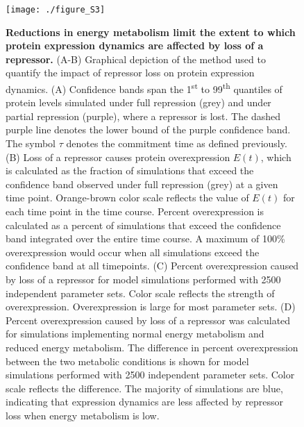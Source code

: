 \begin{figure}[h!]
\centering
\texttt{[image: ./figure\_S3]}
\caption[Reduced metabolism desensitizes protein dynamics to repression.]{\textbf{Reductions in energy metabolism limit the extent to which protein expression dynamics are affected by loss of a repressor.} (A-B) Graphical depiction of the method used to quantify the impact of repressor loss on protein expression dynamics. (A) Confidence bands span the 1\textsuperscript{st} to 99\textsuperscript{th} quantiles of protein levels simulated under full repression (grey) and under partial repression (purple), where a repressor is lost. The dashed purple line denotes the lower bound of the purple confidence band. The symbol $\tau$ denotes the commitment time as defined previously. (B) Loss of a repressor causes protein overexpression $E(t)$, which is calculated as the fraction of simulations that exceed the confidence band observed under full repression (grey) at a given time point. Orange-brown color scale reflects the value of $E(t)$ for each time point in the time course. Percent overexpression is calculated as a percent of simulations that exceed the confidence band integrated over the entire time course. A maximum of 100\% overexpression would occur when all simulations exceed the confidence band at all timepoints. (C) Percent overexpression caused by loss of a repressor for model simulations performed with 2500 independent parameter sets. Color scale reflects the strength of overexpression. Overexpression is large for most parameter sets. (D) Percent overexpression caused by loss of a repressor was calculated for simulations implementing normal energy metabolism and reduced energy metabolism. The difference in percent overexpression between the two metabolic conditions is shown for model simulations performed with 2500 independent parameter sets. Color scale reflects the difference. The majority of simulations are blue, indicating that expression dynamics are less affected by repressor loss when energy metabolism is low.}
\label{fig:metabolism:figS3}
\end{figure}

